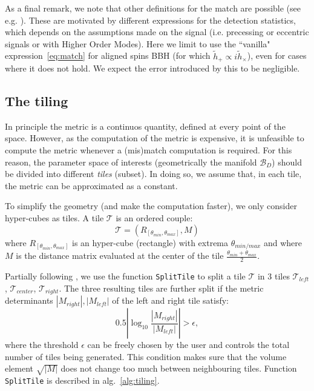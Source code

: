 \documentclass[twocolumn,showpacs,preprintnumbers,nofootinbib,prd,
superscriptaddress,10pt]{revtex4-2}
\begin{document}
As a final remark, we note that other definitions for the match are possible (see e.g. \cite{PhysRevD.94.024012,PhysRevD.97.023004}). These are motivated by different expressions for the detection statistics, which depends on the assumptions made on the signal (i.e. precessing or eccentric signals or with Higher Order Modes). Here we limit to use the ``vanilla" expression~\eqref{eq:match} for aligned spins BBH (for which $\tilde{h}_+ \propto i \tilde{h}_\times$), even for cases where it does not hold. We expect the error introduced by this to be negligible.

\subsection{The tiling} \label{sec:tiling}

In principle the metric is a continuos quantity, defined at every point of the space. However, as the computation of the metric is expensive, it is unfeasible to compute the metric whenever a (mis)match computation is required.
For this reason, the parameter space of interests (geometrically the manifold $\mathcal{B}_D$) should be divided into different {\it tiles} (subset). In doing so, we assume that, in each tile, the metric can be approximated as a constant.

To simplify the geometry (and make the computation faster), we only consider hyper-cubes as tiles. A tile $\mathcal{T}$ is an ordered couple:
\begin{equation} \label{eq:tile}
	\mathcal{T} = \left(R_{[\theta_{min}, \theta_{max}]}, M \right)
\end{equation}
where $R_{[\theta_{min}, \theta_{max}]}$ is an hyper-cube (rectangle) with extrema $\theta_{min/max}$ and where $M$ is the distance matrix evaluated at the center of the tile $\frac{\theta_{min}+\theta_{max}}{2}$.

Partially following \cite{Hanna:2022zpk}, we use the function \texttt{SplitTile} to split a tile $\mathcal{T}$ in 3 tiles $\mathcal{T}_{left}$, $\mathcal{T}_{center}$, $\mathcal{T}_{right}$.
The three resulting tiles are further split if the metric determinants $|M_{right}|, |M_{left}|$ of the left and right tile satisfy:
\begin{equation}
	0.5\left|\log_{\textrm{10}}\frac{|M_{right}|}{|M_{left}|}\right| > \epsilon,
\end{equation}
where the threshold $\epsilon$ can be freely chosen by the user and controls the total number of tiles being generated.
This condition makes sure that the volume element $\sqrt{|M|}$ does not change too much between neighbouring tiles.
Function \texttt{SplitTile} is described in alg.~\ref{alg:tiling}.
\end{document}
